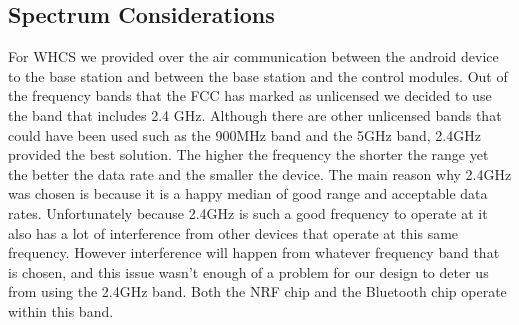 \subsection{Spectrum Considerations}
For WHCS we provided over the air communication between the android
device to the base station and between the base station and the control
modules. Out of the frequency bands that the FCC has marked as unlicensed we
decided to use the band that includes 2.4 GHz. Although there are other
unlicensed bands that could have been used such as the 900MHz band and the 5GHz
band, 2.4GHz provided the best solution. The higher the frequency the shorter
the range yet the better the data rate and the smaller the device. The main
reason why 2.4GHz was chosen is because it is a happy median of good range and
acceptable data rates. Unfortunately because 2.4GHz is such a good frequency to
operate at it also has a lot of interference from other devices that operate at
this same frequency. However interference will happen from whatever frequency
band that is chosen, and this issue wasn{}'t enough of a problem for our design
to deter us from using the 2.4GHz band. Both the NRF chip and the Bluetooth
chip operate within this band.
